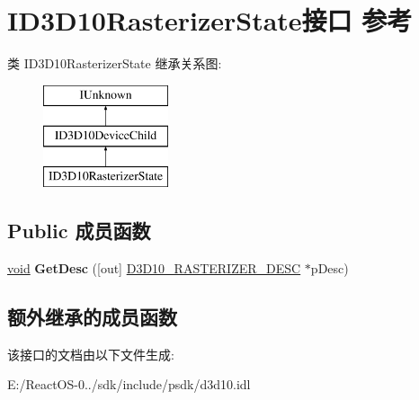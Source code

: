 \hypertarget{interface_i_d3_d10_rasterizer_state}{}\section{I\+D3\+D10\+Rasterizer\+State接口 参考}
\label{interface_i_d3_d10_rasterizer_state}
类 I\+D3\+D10\+Rasterizer\+State 继承关系图\+:\begin{figure}[H]
\begin{center}
\leavevmode
\includegraphics[height=3.000000cm]{interface_i_d3_d10_rasterizer_state}
\end{center}
\end{figure}
\subsection*{Public 成员函数}
\begin{DoxyCompactItemize}
\item 
\mbox{\label{interface_i_d3_d10_rasterizer_state_a5914de5c98126990b89bc2bdc2159e8b}} 
\hyperlink{interfacevoid}{void} {\bfseries Get\+Desc} (\mbox{[}out\mbox{]} \hyperlink{struct_d3_d10___r_a_s_t_e_r_i_z_e_r___d_e_s_c}{D3\+D10\+\_\+\+R\+A\+S\+T\+E\+R\+I\+Z\+E\+R\+\_\+\+D\+E\+SC} $\ast$p\+Desc)
\end{DoxyCompactItemize}
\subsection*{额外继承的成员函数}


该接口的文档由以下文件生成\+:\begin{DoxyCompactItemize}
\item 
E\+:/\+React\+O\+S-\/0../sdk/include/psdk/d3d10.\+idl\end{DoxyCompactItemize}
